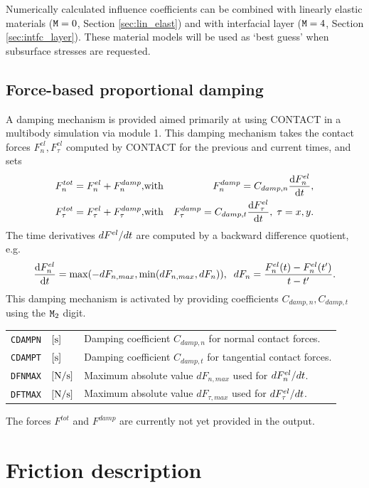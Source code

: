 \documentclass[12pt]{report}
\newenvironment{inputvars}{\vspace{0.4\baselineskip}%

\begin{tabular}{>{\raggedright}p{22mm}p{19mm}p{113mm}}}{
\end{tabular}

}
\newcommand{\inpvar}[3]{{\small\tt #1} & $#2$ & #3 \\[1ex]}
\begin{document}
Numerically calculated influence coefficients can be combined with linearly
elastic materials (${\tt M}=0$, Section \ref{sec:lin_elast}) and with
interfacial layer (${\tt M}=4$, Section \ref{sec:intfc_layer}). These
material models will be used as `best guess' when subsurface stresses
are requested.

\subsection{Force-based proportional damping}
\label{sec:damping}

A damping mechanism is provided aimed primarily at using CONTACT in a
multibody simulation via module 1. This damping mechanism takes the contact
forces $F_n^{el}, F_\tau^{el}$ computed by CONTACT for the previous and
current times, and sets
\begin{eqnarray}
  F_n^{tot} = F_n^{el} + F_n^{damp}, &\mbox{with}&
        F_n^{damp} = C_{damp,n} \frac{{\rm d} F_n^{el}}{{\rm d} t} , \\
  F_\tau^{tot} = F_\tau^{el} + F_\tau^{damp}, &\mbox{with}&
        F_\tau^{damp} = C_{damp,t} \frac{{\rm d} F_\tau^{el}}{{\rm d} t} , \; \tau=x,y .
\end{eqnarray}
The time derivatives $d F^{el}/d t$ are computed by a backward
difference quotient, e.g.\
\begin{equation}
        \frac{{\rm d} F_n^{el}}{{\rm d} t} = \max( -dF_{n,max}, \min( dF_{n,max}, dF_n )),
        \;\; dF_n = \frac{F_n^{el}(t)-F_n^{el}(t')}{t-t'} .
\end{equation}
This damping mechanism is activated by providing coefficients $C_{damp,n},
C_{damp,t}$ using the ${\tt M}_2$ digit. 
\begin{inputvars}
\inpvar{CDAMPN}{\bunit{s}}{Damping coefficient $C_{damp,n}$ for normal
        contact forces.}
\inpvar{CDAMPT}{\bunit{s}}{Damping coefficient $C_{damp,t}$ for tangential
        contact forces.}
\inpvar{DFNMAX}{\bunit{N/s}}{Maximum absolute value $dF_{n,max}$ used for
        $d F_n^{el}/d t$.}
\inpvar{DFTMAX}{\bunit{N/s}}{Maximum absolute value $dF_{\tau,max}$ used
        for $d F_\tau^{el}/d t$.}
\end{inputvars}
The forces $F^{tot}$ and $F^{damp}$ are currently not yet provided in the
output.

\section{Friction description}
\label{sec:fric_dscrp}
\end{document}
